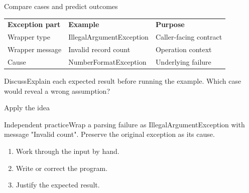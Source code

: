 \documentclass[10pt,aspectratio=169]{beamer}
\begin{document}
\begin{frame}[fragile,t]{Compare cases and predict outcomes}
\small\renewcommand{\arraystretch}{1.5}
\begin{tabularx}{\textwidth}{>{\raggedright\arraybackslash}X>{\raggedright\arraybackslash}X>{\raggedright\arraybackslash}X}\rowcolor{navy}
\color{white}\bfseries Exception part & \color{white}\bfseries Example & \color{white}\bfseries Purpose\\
Wrapper type & IllegalArgumentException & Caller-facing contract\\
Wrapper message & Invalid record count & Operation context\\
Cause & NumberFormatException & Underlying failure\\
\end{tabularx}\par\vspace{3mm}\begin{exampleblock}{Discuss}Explain each expected result before running the example. Which case would reveal a wrong assumption?\end{exampleblock}
\end{frame}

\begin{frame}[fragile,t]{Apply the idea}
\begin{alertblock}{Independent practice}Wrap a parsing failure as IllegalArgumentException with message "Invalid count". Preserve the original exception as its cause.\end{alertblock}\vspace{3mm}\begin{enumerate}\item Work through the input by hand.\item Write or correct the program.\item Justify the expected result.\end{enumerate}
\end{frame}
\end{document}
